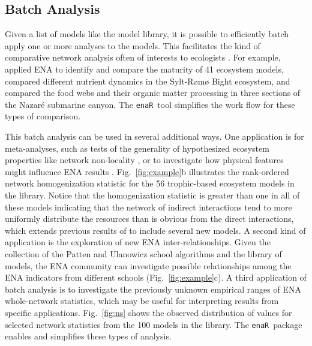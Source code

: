 \documentclass[11pt]{article}
\newcommand{\enaR}{\texttt{enaR}}
\begin{document}
\begin{spacing}{2}
\subsection{Batch Analysis}
Given a list of models like the model library, it is possible to
efficiently batch apply one or more analyses to the models.  This
facilitates the kind of comparative network analysis often of
interests to ecologists \citep{monaco97,christian05_cnea}. For
example, \citet{christensen95} applied ENA to identify and compare the
maturity of 41 ecosystem models,
\citet{baird08_sylt} compared different nutrient dynamics in the
Sylt-R{\o}m{\o} Bight ecosystem, and \citet{vanoevelen2011canyon}
compared the food webs and their organic matter processing in three
sections of the Nazar{\'e} submarine canyon.  The \enaR\ tool
simplifies the work flow for these types of comparison.

This batch analysis can be used in several additional ways.  One
application is for meta-analyses, such as tests of the generality of
hypothesized ecosystem properties like network non-locality
\citep{salas11_did}, %
or to investigate how physical features might influence ENA results
\citep{niquil2012physical}. Fig.~\ref{fig:example}b illustrates the
rank-ordered network homogenization statistic for the 56 trophic-based
ecosystem models in the library. Notice that the homogenization
statistic is greater than one in all of these models indicating that
the network of indirect interactions tend to more uniformly distribute
the resources than is obvious from the direct interactions, which
extends previous results of \citet{borrett10_hmg} to include several
new models.  A second kind of application is the exploration of new
ENA inter-relationships.  Given the collection of the Patten and
Ulanowicz school algorithms and the library of models, the ENA
community can investigate possible relationships among the ENA
indicators from different schools (Fig.~\ref{fig:example}c).  A third
application of batch analysis is to investigate the previously unknown
empirical ranges of ENA whole-network statistics, which may be useful
for interpreting results from specific applications.
Fig.~\ref{fig:ns} shows the observed distribution of values for
selected network statistics from the 100 models in the library. The
\enaR\ package enables and simplifies these types of analysis.


\end{spacing}
\end{document}
